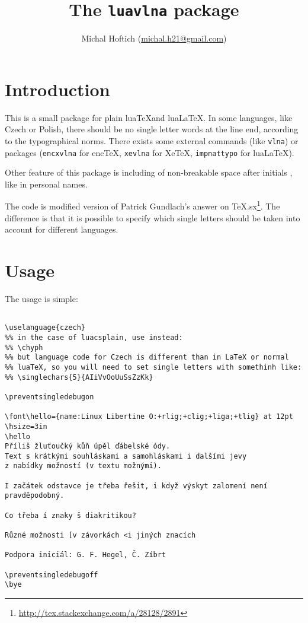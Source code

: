 \documentclass[12pt]{ltxdoc}
\begin{document}
\title{The \verb|luavlna| package}
\author{Michal Hoftich (\url{michal.h21@gmail.com})}
\maketitle
\tableofcontents
\section{Introduction}


This is a small package for plain lua\TeX and lua\LaTeX. In some languages, like
Czech or Polish, there should be no single letter words at the line
end, according to the typographical norms. There exists some
external commands (like \verb!vlna!) or packages (\verb!encxvlna!
for enc\TeX, \verb!xevlna! for Xe\TeX,
\verb!impnattypo! for lua\LaTeX). %

Other feature of this package is including of non-breakable space after initials
, like in personal names. 

The code is modified version of Patrick Gundlach's answer on
TeX.sx\footnote{\url{http://tex.stackexchange.com/a/28128/2891}}.
The difference is that it is possible to specify which single letters
should be taken into account for different languages.


\section{Usage}

The usage is simple:

\begin{verbatim}

\uselanguage{czech}
%% in the case of luacsplain, use instead:
%% \chyph
%% but language code for Czech is different than in LaTeX or normal 
%% luaTeX, so you will need to set single letters with somethinh like:
%% \singlechars{5}{AIiVvOoUuSsZzKk}

\preventsingledebugon

\font\hello={name:Linux Libertine O:+rlig;+clig;+liga;+tlig} at 12pt 
\hsize=3in
\hello
Příliš žluťoučký kůň úpěl ďábelské ódy. 
Text s krátkými souhláskami a samohláskami i dalšími jevy 
z nabídky možností (v textu možnými). 

I začátek odstavce je třeba řešit, i když výskyt zalomení není pravděpodobný.

Co třeba í znaky š diakritikou?

Různé možnosti [v závorkách <i jiných znacích

Podpora iniciál: G. F. Hegel, Č. Zíbrt

\preventsingledebugoff
\bye
\end{verbatim}
\end{document}
